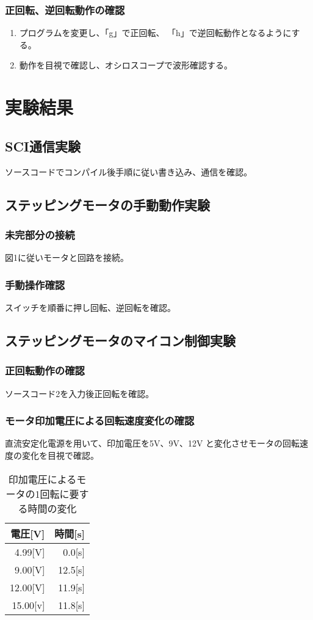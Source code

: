 \documentclass[10pt,a4paper]{jarticle}
\begin{document}
\subsubsection{正回転、逆回転動作の確認}
\begin{enumerate}
 \item プログラムを変更し、「g」で正回転、
 「h」で逆回転動作となるようにする。
 \item 動作を目視で確認し、オシロスコープで波形確認する。
\end{enumerate}
\section{実験結果}
\subsection{SCI通信実験}
ソースコードでコンパイル後手順に従い書き込み、通信を確認。
\subsection{ステッピングモータの手動動作実験}
\subsubsection{未完部分の接続}
図1に従いモータと回路を接続。
\subsubsection{手動操作確認}
スイッチを順番に押し回転、逆回転を確認。
\subsection{ステッピングモータのマイコン制御実験}
\subsubsection{正回転動作の確認}
ソースコード2を入力後正回転を確認。
\subsubsection{モータ印加電圧による回転速度変化の確認}
直流安定化電源を用いて、印加電圧を5V、9V、12V
と変化させモータの回転速度の変化を目視で確認。\par
\begin{table}[htbp]
 \caption{印加電圧によるモータの1回転に要する時間の変化}
 \label{denatu}
 \centering
 \begin{tabular}{|r|r|}\hline
   電圧[V]&時間[s]\\ \hline
   4.99[V]&0.0[s]\\ \hline
   9.00[V]&12.5[s]\\ \hline
   12.00[V]&11.9[s]\\ \hline
   15.00[v]&11.8[s]\\ \hline
 \end{tabular}
\end{table}
\end{document}
